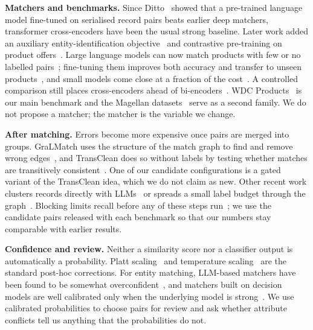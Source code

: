 \documentclass[conference]{IEEEtran}
\begin{document}
\textbf{Matchers and benchmarks.} Since Ditto~\cite{li2020ditto} showed that a pre-trained language
model fine-tuned on serialised record pairs beats earlier deep matchers, transformer cross-encoders have
been the usual strong baseline. Later work added an auxiliary entity-identification
objective~\cite{peeters2021jointbert} and contrastive pre-training on product
offers~\cite{peeters2022supcon}. Large language models can now match products with few or no labelled
pairs~\cite{peeters2023llm}; fine-tuning them improves both accuracy and transfer to unseen
products~\cite{steiner2025finetune}, and small models come close at a fraction of the
cost~\cite{zhang2024anymatch}. A controlled comparison still places cross-encoders ahead of
bi-encoders~\cite{zhang2026beyond}. WDC Products~\cite{peeters2024wdc} is our main benchmark and the
Magellan datasets~\cite{konda2016magellan,mudgal2018deepmatcher,kopcke2010evaluation} serve as a second
family. We do not propose a matcher; the matcher is the variable we change.

\textbf{After matching.} Errors become more expensive once pairs are merged into groups. GraLMatch uses
the structure of the match graph to find and remove wrong edges~\cite{dmeer2025gralmatch}, and TransClean
does so without labels by testing whether matches are transitively consistent~\cite{dmeer2025transclean}.
One of our candidate configurations is a gated variant of the TransClean idea, which we do not claim as
new. Other recent work clusters records directly with LLMs~\cite{fu2026llmcer} or spreads a small label
budget through the graph~\cite{wang2026alper}. Blocking limits recall before any of these steps
run~\cite{zeakis2023embeddings,moslemi2024blocking}; we use the candidate pairs released with each
benchmark so that our numbers stay comparable with earlier results.

\textbf{Confidence and review.} Neither a similarity score nor a classifier output is automatically a
probability. Platt scaling~\cite{platt1999probabilistic} and temperature scaling~\cite{guo2017calibration}
are the standard post-hoc corrections. For entity matching, LLM-based matchers have been found to be
somewhat overconfident~\cite{kamsteeg2025calibration}, and matchers built on decision models are well
calibrated only when the underlying model is strong~\cite{steiner2026decision}. We use calibrated
probabilities to choose pairs for review and ask whether attribute conflicts tell us anything that the
probabilities do not.

\end{document}
